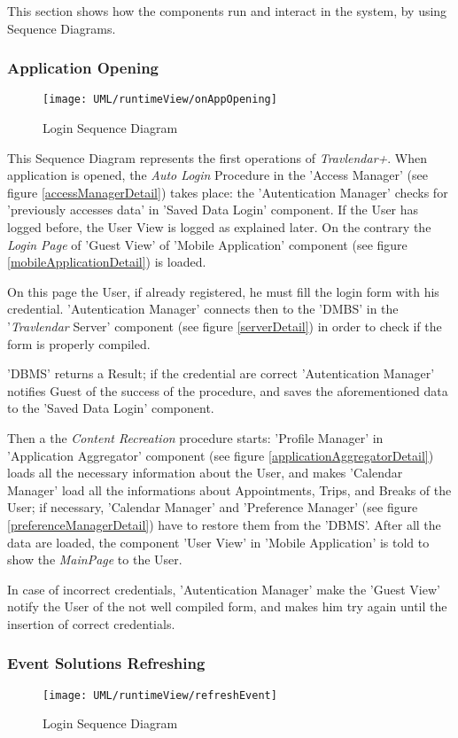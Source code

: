 This section shows how the components run and interact in the system, by using Sequence Diagrams.

\subsubsection{Application Opening}

	\begin{figure}[H]
		\centering
		\texttt{[image: UML/runtimeView/onAppOpening]}
		\caption{Login Sequence Diagram}
		\label{loginRunTimeView}
	\end{figure}
	
	This Sequence Diagram represents the first operations of \textit{Travlendar+}.
	When application is opened, the \textsl{Auto Login} Procedure in the 'Access Manager' (see figure \ref{accessManagerDetail}) takes place: the 'Autentication Manager' checks for 'previously accesses data' in 'Saved Data Login' component. If the User has logged before, the User View is logged as explained later.
	On the contrary the \textsl{Login Page} of 'Guest View' of 'Mobile Application' component  (see figure \ref{mobileApplicationDetail}) is loaded.
	
	On this page the User, if already registered, he must fill the login form with his credential.
	'Autentication Manager' connects then to the 'DMBS' in the  '\textit{Travlendar} Server' component (see figure \ref{serverDetail}) in order to check if the form is properly compiled.
	
	'DBMS' returns a Result; if the credential are correct 'Autentication Manager' notifies Guest of the success of the procedure, and saves the aforementioned data to the 'Saved Data Login' component.
	
	Then a the \textsl{Content Recreation} procedure starts:
	'Profile Manager' in 'Application Aggregator' component (see figure \ref{applicationAggregatorDetail}) loads all the necessary information about the User, and makes 'Calendar Manager' load all the informations about Appointments, Trips, and Breaks of the User; if necessary, 'Calendar Manager' and 'Preference Manager' (see figure \ref{preferenceManagerDetail}) have to restore them from the 'DBMS'.
	After all the data are loaded, the component 'User View' in 'Mobile Application' is told to show the \textsl{MainPage} to the User.
	
	In case of incorrect credentials, 'Autentication Manager' make the 'Guest View' notify the User of the not well compiled form, and makes him try again until the insertion of correct credentials.
	
	
\subsubsection{Event Solutions Refreshing}

	\begin{figure}[H]
		\centering
		\texttt{[image: UML/runtimeView/refreshEvent]}
		\caption{Login Sequence Diagram}
		\label{refreshRunTimeView}
	\end{figure}